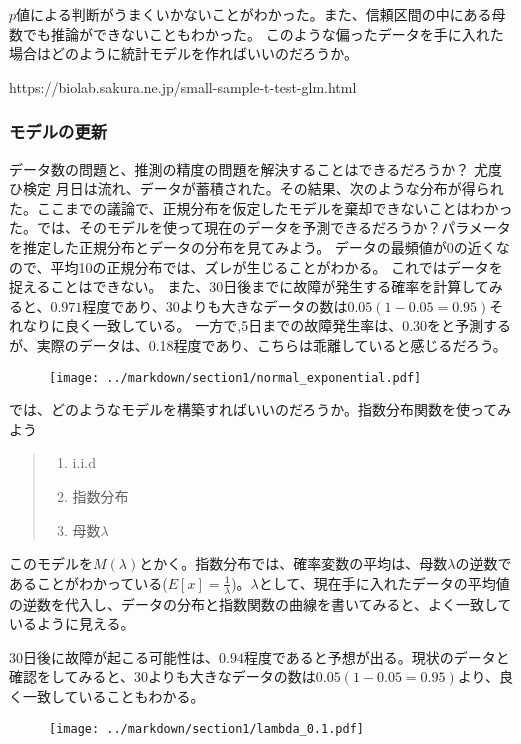 \documentclass[a4paper,11pt,dvipdfmx]{jsarticle}
\begin{document}
$p$値による判断がうまくいかないことがわかった。また、信頼区間の中にある母数でも推論ができないこともわかった。
このような偏ったデータを手に入れた場合はどのように統計モデルを作ればいいのだろうか。
\fi

https://biolab.sakura.ne.jp/small-sample-t-test-glm.html



\subsubsection{モデルの更新}
データ数の問題と、推測の精度の問題を解決することはできるだろうか？
尤度ひ検定
\fi
月日は流れ、データが蓄積された。その結果、次のような分布が得られた。ここまでの議論で、正規分布を仮定したモデルを棄却できないことはわかった。では、そのモデルを使って現在のデータを予測できるだろうか？パラメータを推定した正規分布とデータの分布を見てみよう。
データの最頻値が0の近くなので、平均10の正規分布では、ズレが生じることがわかる。
これではデータを捉えることはできない。
また、$30$日後までに故障が発生する確率を計算してみると、$0.971$程度であり、30よりも大きなデータの数は$0.05(1-0.05=0.95)$それなりに良く一致している。
一方で,5日までの故障発生率は、$0.30$をと予測するが、実際のデータは、0.18程度であり、こちらは乖離していると感じるだろう。
\begin{figure}
\begin{center}
    \texttt{[image: ../markdown/section1/normal\_exponential.pdf]}
\end{center}
\end{figure}


では、どのようなモデルを構築すればいいのだろうか。指数分布関数を使ってみよう
\begin{quote}
    \begin{enumerate}[(1)]
\item i.i.d
\item 指数分布
\item 母数$\lambda$
\end{enumerate}
\end{quote}
このモデルを$M(\lambda)$とかく。指数分布では、確率変数の平均は、母数$\lambda$の逆数であることがわかっている($E[x]=\frac{1}{\lambda}$)。$\lambda$として、現在手に入れたデータの平均値の逆数を代入し、データの分布と指数関数の曲線を書いてみると、よく一致しているように見える。

30日後に故障が起こる可能性は、$0.94$程度であると予想が出る。現状のデータと確認をしてみると、30よりも大きなデータの数は$0.05(1-0.05=0.95)$より、良く一致していることもわかる。
\begin{figure}
\begin{center}
    \texttt{[image: ../markdown/section1/lambda\_0.1.pdf]}
\end{center}
\end{figure}
\end{document}
